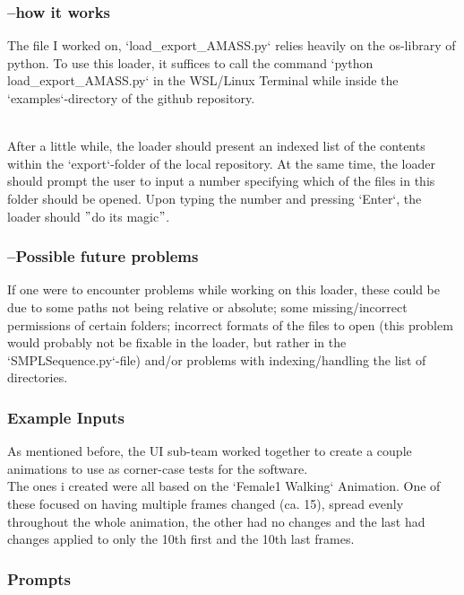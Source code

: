 \documentclass[a4paper]{scrartcl}
\begin{document}
\subsubsection*{--how it works}
The file I worked on, `load\_export\_AMASS.py` relies heavily on the os-library of python.
To use this loader, it suffices to call the command `python load\_export\_AMASS.py` in the WSL/Linux Terminal while inside the `examples`-directory of the github repository.

\\
After a little while, the loader should present an indexed list of the contents within the `export`-folder of the local repository. At the same time, the loader should prompt the user to input a number specifying which of the files in this folder should be opened. Upon typing the number and pressing `Enter`, the loader should $"$do its magic$"$.

\subsubsection*{--Possible future problems}
If one were to encounter problems while working on this loader, these could be due to some paths not being relative or absolute; some missing/incorrect permissions of certain folders; incorrect formats of the files to open (this problem would probably not be fixable in the loader, but rather in the `SMPLSequence.py`-file) and/or problems with indexing/handling the list of directories.

\subsubsection*{Example Inputs}
As mentioned before, the UI sub-team worked together to create a couple animations to use as corner-case tests for the software.\\
The ones i created were all based on the `Female1 Walking` Animation. One of these focused on having multiple frames changed (ca. 15), spread evenly throughout the whole animation, the other had no changes and the last had changes applied to only the 10th first and the 10th last frames.

\subsubsection*{Prompts}
\end{document}
